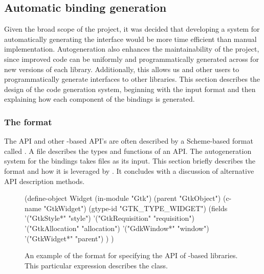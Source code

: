 \documentclass[article,shortnames]{jss}
\begin{document}
\subsection{Automatic binding generation}

Given the broad scope of the project, it was decided that developing a
system for automatically generating the interface would be more time
efficient than manual implementation. Autogeneration also enhances the
maintainability of the project, since improved code can be uniformly
and programmatically generated across for new versions of each
library. Additionally, this allows us and other users to
programmatically generate interfaces to other libraries. This section
describes the design of the code generation system, beginning with the
input format and then explaining how each component of the bindings is
generated.

\subsubsection[The defs format]{The  format}

The  API and other -based API's are often
described by
a Scheme-based \citep{scheme} format called . A
 file describes the types and functions of an API. The
autogeneration system for the  bindings takes
 files as its input. This section briefly describes the
 format and how it is leveraged by . It
concludes
with a discussion of alternative API description methods.

\begin{figure}[h!tbp]
\begin{Code}
(define-object Widget
  (in-module "Gtk")
  (parent "GtkObject")
  (c-name "GtkWidget")
  (gtype-id "GTK_TYPE_WIDGET")
  (fields
    '("GtkStyle*" "style")
    '("GtkRequisition" "requisition")
    '("GtkAllocation" "allocation")
    '("GdkWindow*" "window")
    '("GtkWidget*" "parent")
  )
)
\end{Code}
\caption{\label{fig:defs}An example of the  format for
specifying the API of -based libraries. This particular
expression describes the  class.}
\end{figure}
\end{document}

